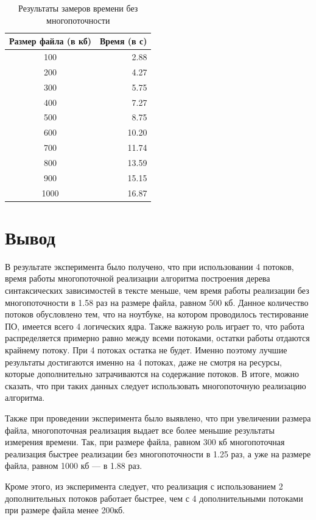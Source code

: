 \begin{table}[h]
	\begin{center}
		\begin{threeparttable}
			\captionsetup{justification=raggedright,singlelinecheck=off}
			\caption{Результаты замеров времени без многопоточности}
			\label{tbl:time_mes_difdiam}
			\begin{tabular}{|c|r|}
				\hline
				Размер файла (в кб) & Время (в с) \\
				\hline
				100 & 2.88 \\ 
				\hline
				200 & 4.27 \\ 
				\hline
				300 & 5.75 \\ 
				\hline
				400 & 7.27 \\ 
				\hline
				500 & 8.75 \\ 
				\hline
				600 & 10.20 \\ 
				\hline
				700 & 11.74 \\ 
				\hline
				800 & 13.59 \\ 
				\hline
				900 & 15.15 \\ 
				\hline
				1000 & 16.87 \\ 
				\hline
			\end{tabular}
		\end{threeparttable}
	\end{center}
\end{table}

\section{Вывод}

В результате эксперимента было получено, что при использовании 4 потоков, время работы многопоточной реализации алгоритма построения дерева синтаксических зависимостей в тексте меньше, чем время работы реализации без многопоточности в 1.58 раз на размере файла, равном 500 кб. Данное количество потоков обусловлено тем, что на ноутбуке, на котором проводилось тестирование ПО, имеется всего 4 логических ядра. Также важную роль играет то, что работа распределяется примерно равно между всеми потоками, остатки работы отдаются крайнему потоку. При 4 потоках остатка не будет. Именно поэтому лучшие результаты достигаются именно на 4 потоках, даже не смотря на ресурсы, которые дополнительно затрачиваются на содержание потоков. В итоге, можно сказать, что при таких данных следует использовать многопоточную реализацию алгоритма.

Также при проведении эксперимента было выявлено, что при увеличении размера файла, многопоточная реализация выдает все более меньшие результаты измерения времени. Так, при размере файла, равном 300 кб многопоточная реализация быстрее реализации без многопоточности в 1.25 раз, а уже на размере файла, равном 1000 кб --- в 1.88 раз. 

Кроме этого, из эксперимента следует, что реализация с использованием 2 дополнительных потоков работает быстрее, чем с 4 дополнительными потоками при размере файла менее 200кб.